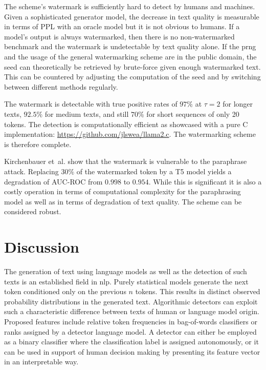     The scheme's watermark is sufficiently hard to detect by humans and machines.
    Given a sophisticated generator model, the decrease in text quality is measurable in terms of PPL with an oracle model but it is not obvious to humans.
    If a model's output is always watermarked, then there is no non-watermarked benchmark and the watermark is undetectable by text quality alone.
    If the \ac{prng} and the usage of the general watermarking scheme are in the public domain, the seed can theoretically be retrieved by brute-force given enough watermarked text.
    This can be countered by adjusting the computation of the seed and by switching between different methods regularly.

    The watermark is detectable with true positive rates of $97\%$ at $\tau = 2$ for longer texts, $92.5\%$ for medium texts, and still $70\%$ for short sequences of only 20 tokens.
    The detection is computationally efficient as showcased with a pure C implementation: \url{https://github.com/jlswea/llama2.c}.
    The watermarking scheme is therefore complete.

    Kirchenbauer et~al. \cite{kirchenbauer2023watermark} show that the watermark is vulnerable to the paraphrase attack.
    Replacing $30\%$ of the watermarked token by a T5 model \cite{raffel2023exploring} yields a degradation of AUC-ROC from $0.998$ to $0.954$.
    While this is significant it is also a costly operation in terms of computational complexity for the paraphrasing model as well as in terms of degradation of text quality.
    The scheme can be considered robust.

    \chapter{Discussion}
    The generation of text using language models as well as the detection of such texts is an established field in \ac{nlp}.
    Purely statistical models generate the next token conditioned only on the previous $n$ tokens.
    This results in distinct observed probability distributions in the generated text.
    Algorithmic detectors can exploit such a characteristic difference between texts of human or language model origin.
    Proposed features include relative token frequencies in bag-of-words classifiers or ranks assigned by a detector language model.
    A detector can either be employed as a binary classifier where the classification label is assigned autonomously, or it can be used in support of human decision making by presenting its feature vector in an interpretable way.

